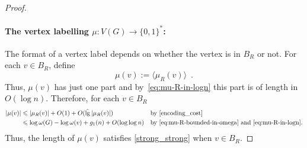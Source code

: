 \documentclass{patmorin}
\let\eqref\cref
\renewcommand{\leq}{\leqslant}
\DeclareMathOperator{\lgg}{\hat{lg}}
\newcommand{\Oh}{O}
\begin{document}
\begin{proof}
  \paragraph{\boldmath The vertex labelling $\mu:V(G)\to\{0,1\}^*$:}
  The format of a vertex label depends on whether the vertex is in $B_R$ or not.
  For each $v\in B_R$, define
  \[
    \mu(v) := \langle\mu_R(v)\rangle\enspace.
  \]
  Thus, $\mu(v)$ has just one part and
  by~\eqref{eq:mu-R-in-logn} this part is of length in $\Oh(\log n)$.
  Therefore,
  for each $v\in B_R$
  \begin{align*}
    |\mu(v)|
     & \leq |\mu_R(v)| + \Oh(1) + \Oh(\lgg|\mu_R(v)|)                &  & \text{by~\eqref{encoding_cost}}                                           \\
     & \leq \log\omega(G) - \log\omega(v) + g_1(n) + \Oh(\log\log n) &  & \textrm{by~\eqref{eq:mu-R-bounded-in-omega} and~\eqref{eq:mu-R-in-logn}.}
  \end{align*}
  Thus, the length of $\mu(v)$ satisfies \eqref{strong_strong} when $v\in B_R$.


\end{proof}
\end{document}
